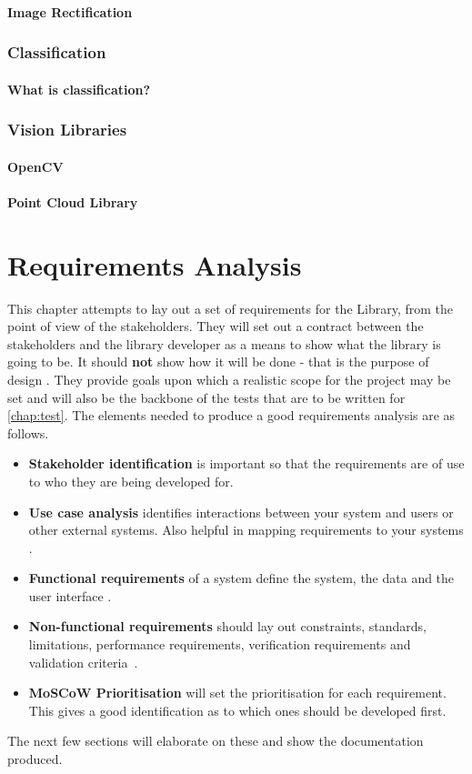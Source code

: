 \documentclass[11pt,oneside]{report}
\begin{document}
				\subsubsection{Image Rectification}
				
				
			\subsection{Classification}
				\subsubsection{What is classification?}
			\subsection{Vision Libraries}
				\subsubsection{OpenCV}
				\subsubsection{Point Cloud Library}
				
	\chapter{Requirements Analysis}\label{chap:req}
	This chapter attempts to lay out a set of requirements for the Library, from the point of view of the stakeholders.
	They will set out a contract between the stakeholders and the library developer as a means to show what the library is going to be. It should \textbf{not} show how it will be done - that is the purpose of design \cite{book:dawson}.
	They provide goals upon which a realistic scope for the project may be set and will also be the backbone of the tests that are to be written for \autoref{chap:test}.
	The elements needed to produce a good requirements analysis are as follows.
	\begin{itemize}
		\item \textbf{Stakeholder identification} is important so that the requirements are of use to who they are being developed for.
		\item \textbf{Use case analysis} identifies interactions between your system and users or other external systems. Also helpful in mapping requirements to your systems \cite{book:uml}.
		\item \textbf{Functional requirements} of a system define the system, the data and the user interface \cite{book:dawson}.
		\item \textbf{Non-functional requirements} should lay out constraints, standards, limitations, performance requirements, verification requirements and validation criteria~\cite{book:dawson}.
		\item \textbf{MoSCoW Prioritisation} will set the prioritisation for each requirement. This gives a good identification as to which ones should be developed first.
	\end{itemize}
	The next few sections will elaborate on these and show the documentation produced. 
\end{document}
